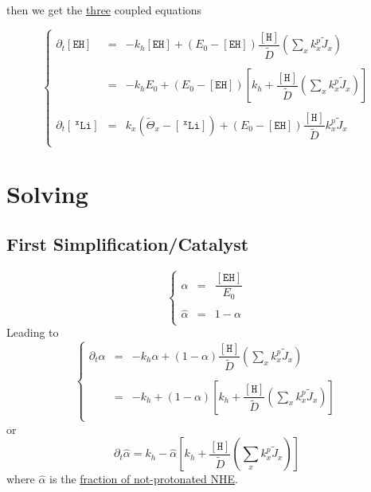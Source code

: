 \documentclass[aps,onecolumn,12pt]{revtex4}
\newcommand{\mychem}[1]{\mathtt{#1}}
\newcommand{\myconc}[1]{\left\lbrack{#1}\right\rbrack}
\newcommand{\spLi}[1]{{~^{\mychem{#1}}\mychem{Li}}}
\newcommand{\Li}[1]{\myconc{\spLi{#1}}}
\newcommand{\spEHin}{\mychem{EH}}
\newcommand{\EHin}{\myconc{\spEHin}}
\newcommand{\spproton}{\mychem{H}}
\newcommand{\proton}{\myconc{\spproton}}
\begin{document}
then we get the \underline{three} coupled equations  

\begin{equation}
\left\lbrace
	\begin{array}{rcl}
		\partial_t\EHin & = & -k_h \EHin + \left(E_0- \EHin\right) \dfrac{\proton}{\tilde{D}} \left(\sum_x k_x^p \tilde{J}_x \right)  
		\\
		\\
		& = & 
		-k_h E_0+ \left(E_0- \EHin\right)\left\lbrack k_h+ \dfrac{\proton}{\tilde{D}} \left(\sum_x k_x^p \tilde{J}_x \right)\right] 
		\\
		\\
		\partial_t\Li{x} & = & k_x \left(\tilde{\Theta}_x -\Li{x} \right)  + \left(E_0-\EHin\right) \dfrac{\proton}{\tilde{D}}   k_x^p \tilde{J}_x  
		\\
	\end{array}
\right.
\end{equation}

\section{Solving}

\subsection{First Simplification/Catalyst}
\begin{equation}
\left\lbrace
\begin{array}{rcl}
	\alpha & = & \dfrac{\EHin}{E_0}\\
	\\
	\hat\alpha & = & 1-\alpha\\
\end{array}
\right.
\end{equation}
Leading to
\begin{equation}
\left\lbrace
\begin{array}{rcl}
\partial_t\alpha & = & -k_h \alpha + \left(1- \alpha\right) \dfrac{\proton}{\tilde{D}} \left(\sum_x k_x^p \tilde{J}_x \right)  
		\\
		\\
		& = & 
		-k_h + \left(1- \alpha\right)\left\lbrack k_h+ \dfrac{\proton}{\tilde{D}} \left(\sum_x k_x^p \tilde{J}_x \right)\right] 
		\\
		\end{array}
\right.
\end{equation}
or
\begin{equation}
	\partial_t \hat\alpha = k_h - \hat\alpha \left\lbrack k_h+ \dfrac{\proton}{\tilde{D}} \left(\sum_x k_x^p \tilde{J}_x \right)\right] 
\end{equation}
where $\hat\alpha$ is the \underline{fraction of not-protonated NHE}.
\end{document}
